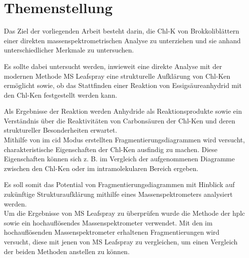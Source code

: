 \chapter{Themenstellung} \label{sec:Themenstellung}

Das Ziel der vorliegenden Arbeit besteht darin, die \gls{Chl-K} von Brokkoliblättern einer direkten massenspektrometrischen Analyse zu unterziehen und sie anhand unterschiedlicher Merkmale zu untersuchen.

Es sollte dabei untersucht werden, inwieweit eine direkte Analyse mit der modernen Methode MS Leafspray eine strukturelle Aufklärung von \gls{Chl-K}en ermöglicht sowie, ob das Stattfinden einer Reaktion von Essigsäureanhydrid mit den \gls{Chl-K}en festgestellt werden kann. 

Als Ergebnisse der Reaktion werden Anhydride als Reaktionsprodukte sowie ein Verständnis über die Reaktivitäten von Carbonsäuren der \gls{Chl-K}en und deren struktureller Besonderheiten erwartet.\\

Mithilfe von im \gls{cid} Modus erstellten Fragmentierungsdiagrammen wird versucht, charakteristische Eigenschaften der \gls{Chl-K}en ausfindig zu machen. Diese Eigenschaften können sich z. B. im Vergleich der aufgenommenen Diagramme zwischen den \gls{Chl-K}en oder im intramolekularen Bereich ergeben. 

Es soll somit das Potential von Fragmentierungsdiagrammen mit Hinblick auf zukünftige Strukturaufklärung mithilfe eines Massenspektrometers analysiert werden. \\

Um die Ergebnisse von MS Leafspray zu überprüfen wurde die Methode der \gls{hplc} sowie ein hochauflösendes Massenspektrometer verwendet. Mit den im hochauflösenden Massenspektrometer erhaltenen Fragmentierungen wird versucht, diese mit jenen von MS Leafspray zu vergleichen, um einen Vergleich der beiden Methoden anstellen zu können.





